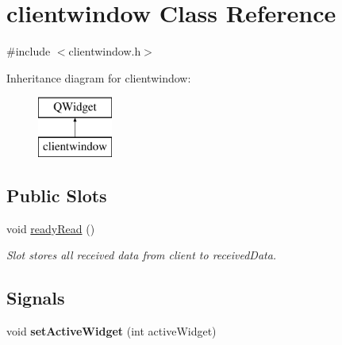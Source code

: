 \hypertarget{classclientwindow}{}\section{clientwindow Class Reference}
\label{classclientwindow}


{\ttfamily \#include $<$clientwindow.\+h$>$}

Inheritance diagram for clientwindow\+:\begin{figure}[H]
\begin{center}
\leavevmode
\includegraphics[height=2.000000cm]{classclientwindow}
\end{center}
\end{figure}
\subsection*{Public Slots}
\begin{DoxyCompactItemize}
\item 
void \mbox{\hyperlink{classclientwindow_a0b2358b8e187213e045381ed2d582e3e}{ready\+Read}} ()
\begin{DoxyCompactList}\small\item\em Slot stores all received data from client to received\+Data. \end{DoxyCompactList}\end{DoxyCompactItemize}
\subsection*{Signals}
\begin{DoxyCompactItemize}
\item 
\mbox{\label{classclientwindow_a9770acc31c02f795535190e795e616da}} 
void {\bfseries set\+Active\+Widget} (int active\+Widget)
\end{DoxyCompactItemize}
